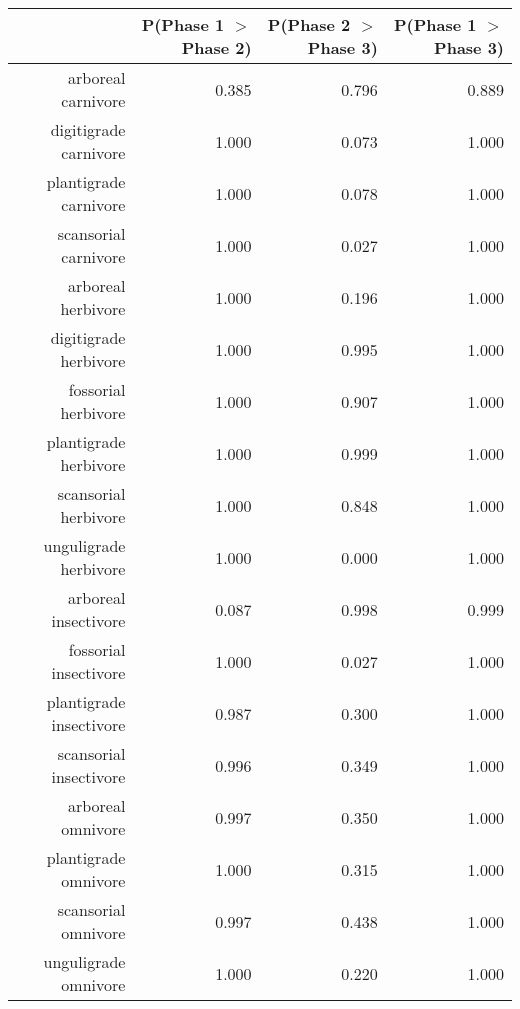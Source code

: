 \begin{table}[ht]
\centering
\begin{tabular}{rrrr}
  \hline
 & P(Phase 1 $>$ Phase 2) & P(Phase 2 $>$ Phase 3) & P(Phase 1 $>$ Phase 3) \\ 
  \hline
arboreal carnivore & 0.385 & 0.796 & 0.889 \\ 
  digitigrade carnivore & 1.000 & 0.073 & 1.000 \\ 
  plantigrade carnivore & 1.000 & 0.078 & 1.000 \\ 
  scansorial carnivore & 1.000 & 0.027 & 1.000 \\ 
  arboreal herbivore & 1.000 & 0.196 & 1.000 \\ 
  digitigrade herbivore & 1.000 & 0.995 & 1.000 \\ 
  fossorial herbivore & 1.000 & 0.907 & 1.000 \\ 
  plantigrade herbivore & 1.000 & 0.999 & 1.000 \\ 
  scansorial herbivore & 1.000 & 0.848 & 1.000 \\ 
  unguligrade herbivore & 1.000 & 0.000 & 1.000 \\ 
  arboreal insectivore & 0.087 & 0.998 & 0.999 \\ 
  fossorial insectivore & 1.000 & 0.027 & 1.000 \\ 
  plantigrade insectivore & 0.987 & 0.300 & 1.000 \\ 
  scansorial insectivore & 0.996 & 0.349 & 1.000 \\ 
  arboreal omnivore & 0.997 & 0.350 & 1.000 \\ 
  plantigrade omnivore & 1.000 & 0.315 & 1.000 \\ 
  scansorial omnivore & 0.997 & 0.438 & 1.000 \\ 
  unguligrade omnivore & 1.000 & 0.220 & 1.000 \\ 
   \hline
\end{tabular}
\label{tab:origin_plant}
\end{table}
